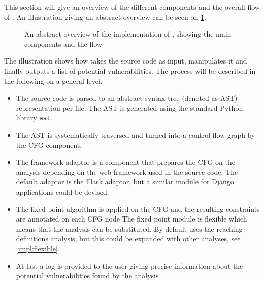 \label{impl:overview}
This section will give an overview of the different components and the overall flow of \pyt{}.
An illustration giving an abstract overview can be seen on \cref{figure:implementation_overview}.

\begin{figure}
  
  \caption{An abstract overview of the implementation of \pyt{}, showing the main components and the flow}
  \label{figure:implementation_overview}
\end{figure}

The illustration shows how  \pyt{} takes the source code as input, manipulates it and finally outputs a list of potential vulnerabilities.
The process will be described in the following on a general level.

\begin{itemize}
\item The source code is parsed to an abstract syntax tree (denoted as AST) representation per file.
  The AST is generated using the standard Python library \texttt{ast}\cite{python_ast}.
\item The AST is systematically traversed and turned into a control flow graph by the CFG component.
\item The framework adaptor is a component that prepares the CFG on the analysis depending on the web framework used in the source code.
  The default adaptor is the Flask adaptor, but a similar module for Django applications could be devised.
\item The fixed point algorithm is applied on the CFG and the resulting constraints are annotated on each CFG node
  The fixed point module is flexible which means that the analysis can be substituted.
  By default \pyt{} uses the reaching definitions analysis, but this could be expanded with other analyses, see \cref{impl:flexible}.
\item At last a log is provided to the user giving precise information about the potential vulnerabilities found by the analysis
\end{itemize}
